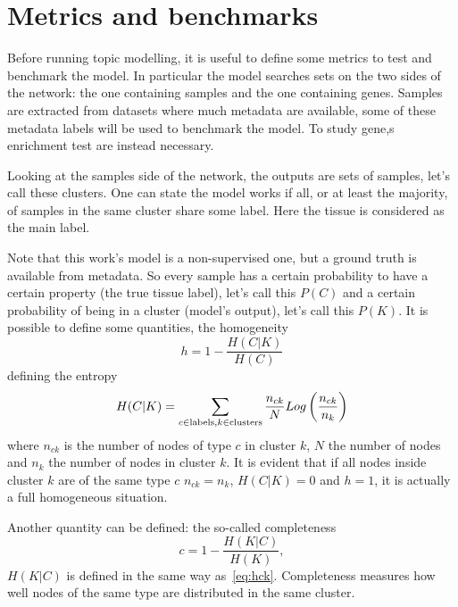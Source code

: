 \section{Metrics and benchmarks}
Before running topic modelling, it is useful to define some metrics to test and benchmark the model. In particular the model searches sets on the two sides of the network: the one containing samples and the one containing genes. Samples are extracted from datasets where much metadata are available, some of these metadata labels will be used to benchmark the model. To study gene,s enrichment test are instead necessary.

Looking at the samples side of the network, the outputs are sets of samples, let's call these clusters. One can state the model works if all, or at least the majority, of samples in the same cluster share some label. Here the tissue is considered as the main label.

Note that this work's model is a non-supervised one, but a ground truth is available from metadata. So every sample has a certain probability to have a certain property (the true tissue label), let's call this $P(C)$ and a certain probability of being in a cluster (model's output), let's call this $P(K)$.
It is possible to define some quantities, the homogeneity
\begin{equation}\label{eq:homogeneity}
    h=1-\frac{H(C|K)}{H(C)}
\end{equation}
defining the entropy
\begin{equation}\label{eq:hck}
    H(C|K)=\sum_{c\in \mathrm{labels},\\ k \in \mathrm{clusters}}\frac{n_{c k}}{N}Log\left(\frac{n_{c k}}{n_k}\right)
\end{equation}
where $n_{c k}$ is the number of nodes of type $c$ in cluster $k$, $N$ the number of nodes and $n_k$ the number of nodes in cluster $k$. It is evident that if all nodes inside cluster $k$ are of the same type $c$ $n_{c k}=n_{k}$, $H(C|K)=0$ and $h=1$, it is actually a full homogeneous situation.

Another quantity can be defined: the so-called completeness
\begin{equation}\label{eq:completness}
    c=1-\frac{H(K|C)}{H(K)},
\end{equation}
$H(K|C)$ is defined in the same way as~\ref{eq:hck}. Completeness measures how well nodes of the same type are distributed in the same cluster.

